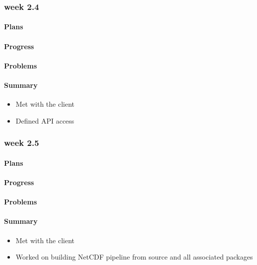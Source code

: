 \documentclass[onecolumn, draftclsnofoot,10pt, compsoc]{article}
\begin{document}
		\subsubsection{week 2.4}
			\paragraph{Plans} \hfill \break

			\paragraph{Progress} \hfill \break

			\paragraph{Problems} \hfill \break

			\paragraph{Summary} \hfill \break
				\begin{itemize}
                    \item Met with the client
                    \item Defined API access
                \end{itemize}

		\subsubsection{week 2.5}
			\paragraph{Plans} \hfill \break

			\paragraph{Progress} \hfill \break

			\paragraph{Problems} \hfill \break

			\paragraph{Summary} \hfill \break
				\begin{itemize}
                    \item Met with the client
                    \item Worked on building NetCDF pipeline from source and all associated packages
                \end{itemize}
\end{document}
